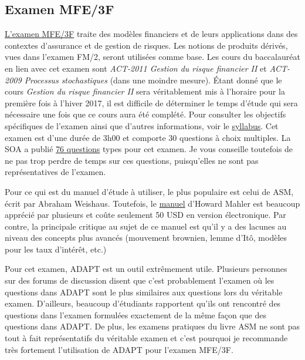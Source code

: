 \documentclass[11pt,french]{article}
\begin{document}
\newpage
\subsection*{Examen MFE/3F}
\label{subsec:exammfe}
\href{https://www.soa.org/education/exam-req/edu-exam-mfe-detail.aspx}{L'examen MFE/3F} traite des modèles financiers et de leurs applications dans des contextes d'assurance et de gestion de risques. Les notions de produits dérivés, vues dans l'examen FM/2, seront utilisées comme base. Les cours du baccalauréat en lien avec cet examen sont \textit{ACT-2011 Gestion du risque financier II} et \textit{ACT-2009 Processus stochastiques} (dans une moindre mesure). Étant donné que le cours \textit{Gestion du risque financier II} sera véritablement mis à l'horaire pour la première fois à l'hiver 2017, il est difficile de déterminer le temps d'étude qui sera nécessaire une fois que ce cours aura été complété. Pour consulter les objectifs spécifiques de l'examen ainsi que d'autres informations, voir le \href{https://www.soa.org/Files/Edu/2016/edu-2016-11-mfe-syllabus.pdf}{syllabus}. Cet examen est d'une durée de 3h00 et comporte 30 questions à choix multiples. La SOA a publié \href{http://www.soa.org/files/edu/edu-exam-mfe-sample-quest-sol.pdf}{76 questions} types pour cet examen. Je vous conseille toutefois de ne pas trop perdre de temps sur ces questions, puisqu'elles ne sont pas représentatives de l'examen.\vspace{\baselineskip}

Pour ce qui est du manuel d'étude à utiliser, le plus populaire est celui de ASM, écrit par Abraham Weishaus. Toutefois, le \href{http://howardmahler.com/Teaching/MFE.html}{manuel} d'Howard Mahler est beaucoup apprécié par plusieurs et coûte seulement 50 USD en version électronique. Par contre, la principale critique au sujet de ce manuel est qu'il y a des lacunes au niveau des concepts plus avancés (mouvement brownien, lemme d'Itô, modèles pour les taux d'intérêt, etc.)\vspace{\baselineskip}

Pour cet examen, ADAPT est un outil extrêmement utile. Plusieurs personnes sur des forums de discussion disent que c'est probablement l'examen où les questions dans ADAPT sont le plus similaires aux questions lors du véritable examen. D'ailleurs, beaucoup d'étudiants rapportent qu'ils ont rencontré des questions dans l'examen formulées exactement de la même façon que des questions dans ADAPT. De plus, les examens pratiques du livre ASM ne sont pas tout à fait représentatifs du véritable examen et c'est pourquoi je recommande très fortement l'utilisation de ADAPT pour l'examen MFE/3F.\vspace{\baselineskip}
\end{document}
